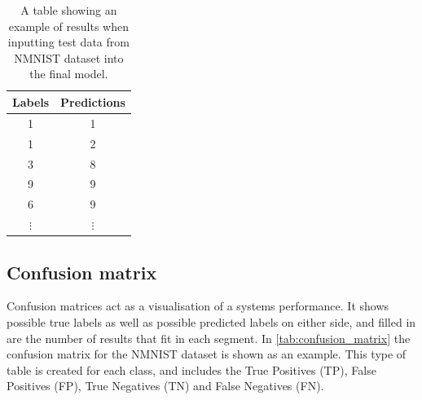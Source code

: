 \begin{table}[htb]
    \centering
    \begin{tabular}{|| c  | c ||}
        \hline
        Labels     & Predictions \\
        \hline \hline
        1          & 1           \\
        \hline
        1          & 2           \\
        \hline
        3          & 8           \\
        \hline
        9          & 9           \\
        \hline
        6          & 9           \\
        \hline
        $ \vdots $ & $ \vdots $  \\
    \end{tabular}
    \caption{A table showing an example of results when inputting test data from NMNIST dataset\cite{NMNIST} into the final model.}
    \label{tab:possible_results}
\end{table}

\subsection{Confusion matrix}

Confusion matrices act as a visualisation of a systems performance. It shows possible true labels as well as possible predicted labels on either side, and filled in are the number of results that fit in each segment. In \cref{tab:confusion_matrix} the confusion matrix for the NMNIST dataset is shown as an example. This type of table is created for each class, and includes the True Positives (TP), False Positives (FP), True Negatives (TN) and False Negatives (FN).

